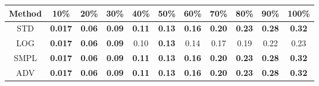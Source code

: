 \documentclass{standalone}
\begin{document}
\begin{tabular}{c|cccccccccc}
      \toprule
      Method & 10\% & 20\% & 30\% & 40\% & 50\% & 60\% & 70\% & 80\% & 90\% & 100\% \\
      \midrule
STD & \textbf{0.017} & \textbf{0.06} & \textbf{0.09} & \textbf{0.11} & \textbf{0.13} & \textbf{0.16} & \textbf{0.20} & \textbf{0.23} & \textbf{0.28} & \textbf{0.32}\\
LOG & \textbf{0.017} & \textbf{0.06} & \textbf{0.09} & 0.10 & \textbf{0.13} & 0.14 & 0.17 & 0.19 & 0.22 & 0.23\\
SMPL & \textbf{0.017} & \textbf{0.06} & \textbf{0.09} & \textbf{0.11} & \textbf{0.13} & \textbf{0.16} & \textbf{0.20} & \textbf{0.23} & \textbf{0.28} & \textbf{0.32}\\
ADV & \textbf{0.017} & \textbf{0.06} & \textbf{0.09} & \textbf{0.11} & \textbf{0.13} & \textbf{0.16} & \textbf{0.20} & \textbf{0.23} & \textbf{0.28} & \textbf{0.32}\\
  \bottomrule
\end{tabular}
\end{document}
